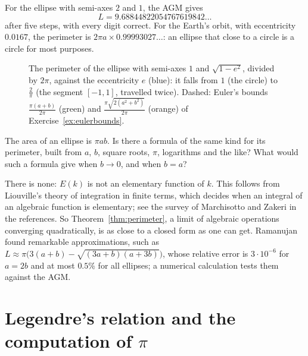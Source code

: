 For the ellipse with semi-axes $2$ and $1$, the AGM gives
\[
L=9.68844822054767619842\ldots
\]
after five steps, with every digit correct. For the Earth's orbit,
with eccentricity $0.0167$, the perimeter is $2\pi a\times0.99993027\ldots$: an ellipse that close to a circle is a circle for most purposes.

\begin{figure}[ht]
\centering
{}
\caption{The perimeter of the ellipse with semi-axes $1$ and $\sqrt{1-e^2}$, divided by $2\pi$, against the eccentricity $e$ (blue): it falls from $1$ (the circle) to
$\frac2\pi$ (the segment $[-1,1]$, travelled twice). Dashed: Euler's bounds $\frac{\pi(a+b)}{2\pi}$ (green) and $\frac{\pi\sqrt{2(a^2+b^2)}}{2\pi}$ (orange) of Exercise~\ref{ex:eulerbounds}.}
\label{fig:perimeter}
\end{figure}

\begin{think}
The area of an ellipse is $\pi ab$. Is there a formula of the same kind for its perimeter, built from $a$, $b$, square roots, $\pi$, logarithms and the
like? What would such a formula give when $b\to0$, and when $b=a$?
\end{think}

\begin{remark}
There is none: $E(k)$ is not an elementary function of $k$. This follows from Liouville's theory of integration in finite terms, which decides when an
integral of an algebraic function is elementary; see the survey of Marchisotto and Zakeri in the references. So Theorem~\ref{thm:perimeter}, a limit of
algebraic operations converging quadratically, is as close to a closed form as one can get. Ramanujan found remarkable approximations, such as
$L\approx\pi\bigl(3(a+b)-\sqrt{(3a+b)(a+3b)}\bigr)$, whose relative error is $3\cdot10^{-6}$ for $a=2b$ and at most $0.5\%$ for all ellipses; a numerical calculation tests them
against the AGM.
\end{remark}

\section{Legendre's relation and the computation of $\pi$}

